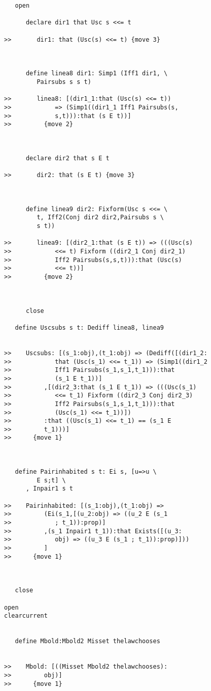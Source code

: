 \documentclass[12pt]{article}
\begin{document}
\begin{verbatim}
   open

      declare dir1 that Usc s <<= t

>>       dir1: that (Usc(s) <<= t) {move 3}



      define linea8 dir1: Simp1 (Iff1 dir1, \
         Pairsubs s s t)

>>       linea8: [(dir1_1:that (Usc(s) <<= t))
>>            => (Simp1((dir1_1 Iff1 Pairsubs(s,
>>            s,t))):that (s E t))]
>>         {move 2}



      declare dir2 that s E t

>>       dir2: that (s E t) {move 3}



      define linea9 dir2: Fixform(Usc s <<= \
         t, Iff2(Conj dir2 dir2,Pairsubs s \
         s t))

>>       linea9: [(dir2_1:that (s E t)) => (((Usc(s)
>>            <<= t) Fixform ((dir2_1 Conj dir2_1)
>>            Iff2 Pairsubs(s,s,t))):that (Usc(s)
>>            <<= t))]
>>         {move 2}



      close

   define Uscsubs s t: Dediff linea8, linea9


>>    Uscsubs: [(s_1:obj),(t_1:obj) => (Dediff([(dir1_2:
>>            that (Usc(s_1) <<= t_1)) => (Simp1((dir1_2
>>            Iff1 Pairsubs(s_1,s_1,t_1))):that
>>            (s_1 E t_1))]
>>         ,[(dir2_3:that (s_1 E t_1)) => (((Usc(s_1)
>>            <<= t_1) Fixform ((dir2_3 Conj dir2_3)
>>            Iff2 Pairsubs(s_1,s_1,t_1))):that
>>            (Usc(s_1) <<= t_1))])
>>         :that ((Usc(s_1) <<= t_1) == (s_1 E
>>         t_1)))]
>>      {move 1}



   define Pairinhabited s t: Ei s, [u=>u \
         E s;t] \
      , Inpair1 s t

>>    Pairinhabited: [(s_1:obj),(t_1:obj) =>
>>         (Ei(s_1,[(u_2:obj) => ((u_2 E (s_1
>>            ; t_1)):prop)]
>>         ,(s_1 Inpair1 t_1)):that Exists([(u_3:
>>            obj) => ((u_3 E (s_1 ; t_1)):prop)]))
>>         ]
>>      {move 1}



   close

open
clearcurrent


   define Mbold:Mbold2 Misset thelawchooses


>>    Mbold: [((Misset Mbold2 thelawchooses):
>>         obj)]
>>      {move 1}




\end{verbatim}
\end{document}
